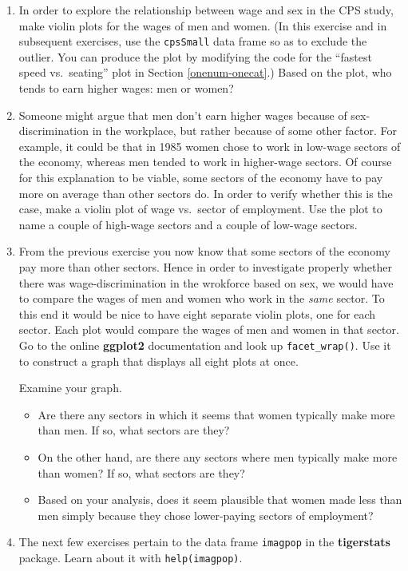 \documentclass[]{book}
\providecommand{\tightlist}{%
  \setlength{\itemsep}{0pt}\setlength{\parskip}{0pt}}
\theoremstyle{definition}
\theoremstyle{definition}
\theoremstyle{definition}
\theoremstyle{remark}
\begin{document}
{\begin{enumerate}
  Write the code needed to find the age, sex and sector of employment of
  the person who made this extraoridinarily high wage. Report the age,
  sex and sector of this person.

  Create a new data frame called \texttt{cpsSmall} that is the same as
  \texttt{CPC85} execept that it excludes the row corresponding to the
  outlier-individual.
\item
  In order to explore the relationship between wage and sex in the CPS
  study, make violin plots for the wages of men and women. (In this
  exercise and in subsequent exercises, use the \texttt{cpsSmall} data
  frame so as to exclude the outlier. You can produce the plot by
  modifying the code for the ``fastest speed vs.~seating'' plot in
  Section \ref{onenum-onecat}.) Based on the plot, who tends to earn
  higher wages: men or women?
\item
  Someone might argue that men don't earn higher wages because of
  sex-discrimination in the workplace, but rather because of some other
  factor. For example, it could be that in 1985 women chose to work in
  low-wage sectors of the economy, whereas men tended to work in
  higher-wage sectors. Of course for this explanation to be viable, some
  sectors of the economy have to pay more on average than other sectors
  do. In order to verify whether this is the case, make a violin plot of
  wage vs.~sector of employment. Use the plot to name a couple of
  high-wage sectors and a couple of low-wage sectors.
\item
  From the previous exercise you now know that some sectors of the
  economy pay more than other sectors. Hence in order to investigate
  properly whether there was wage-discrimination in the wrokforce based
  on sex, we would have to compare the wages of men and women who work
  in the \emph{same} sector. To this end it would be nice to have eight
  separate violin plots, one for each sector. Each plot would compare
  the wages of men and women in that sector. Go to the online
  \textbf{ggplot2} documentation and look up \texttt{facet\_wrap()}. Use
  it to construct a graph that displays all eight plots at once.

  Examine your graph.

  \begin{itemize}
  \tightlist
  \item
    Are there any sectors in which it seems that women typically make
    more than men. If so, what sectors are they?
  \item
    On the other hand, are there any sectors where men typically make
    more than women? If so, what sectors are they?
  \item
    Based on your analysis, does it seem plausible that women made less
    than men simply because they chose lower-paying sectors of
    employment?
  \end{itemize}
\item
  The next few exercises pertain to the data frame \texttt{imagpop} in
  the \textbf{tigerstats} package. Learn about it with
  \texttt{help(imagpop)}.


\end{enumerate}}
\end{document}
